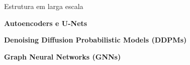 \begin{frame}[c]{Estrutura em larga escala}
    \centering



    \begin{tcolorbox}[hbox] %
        \large \textbf{Autoencoders e U-Nets}
    \end{tcolorbox}
    \vspace{0.5cm}
    \begin{tcolorbox}[hbox] %
        \large \textbf{Denoising Diffusion Probabilistic Models (DDPMs)}
    \end{tcolorbox}
    \vspace{0.5cm}
    \begin{tcolorbox}[hbox] %
        \large \textbf{Graph Neural Networks (GNNs)}
    \end{tcolorbox}
\end{frame}

